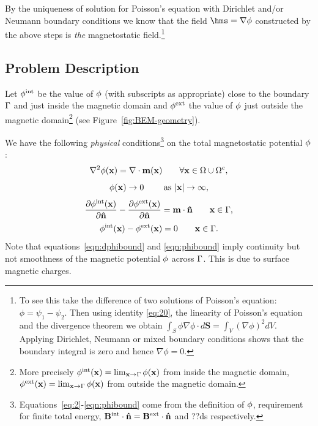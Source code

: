 By the uniqueness of solution for Poisson's equation with Dirichlet and/or Neumann boundary conditions we know that the field $ \hms = \nabla \phim$  constructed by the above steps is \emph{the} magnetostatic field.\footnote{To see this take the difference of two solutions of Poisson's equation: $\phi = \psi_1 - \psi_2$. Then using identity \eqref{eq:20}, the linearity of Poisson's equation and the divergence theorem we obtain $\int_S \phi \nabla \phi \cdot d \mathbf{S} = \int_V (\nabla \phi)^2 dV$. Applying Dirichlet, Neumann or mixed boundary conditions shows that the boundary integral is zero and hence $\nabla \phi = 0$.}

\subsection{Problem Description}
\label{sec:problem-description}
Let $\phi^{\text{int}}$ be the value of $\phi$ (with subscripts as appropriate) close to the boundary ${\Gamma}$ and just inside the magnetic domain  and $\phi^{\text{ext}}$ the value of $\phi$ just outside the magnetic domain\footnote{More precisely $\phi^{\text{int}}(\mathbf{x}) = \lim_{\mathbf{x} \rightarrow {\Gamma}} \phi(\mathbf{x})$ from inside the magnetic domain, $\phi^{\text{ext}}(\mathbf{x}) = \lim_{\mathbf{x} \rightarrow {\Gamma}} \phi(\mathbf{x})$ from outside the magnetic domain.} (see Figure~\ref{fig:BEM-geometry}).

We have the following \emph{physical} conditions\footnote{Equations~\eqref{eq:2}-\eqref{eqn:phibound} come from the definition of $\phi$, requirement for finite total energy, $\mathbf{B}^\text{int} \cdot \mathbf{\hat{n}} = \mathbf{B}^\text{ext} \cdot \mathbf{\hat{n}}$ and ??ds respectively.} on the total magnetostatic potential $\phi$:
\begin{equation}
  \nabla^2 \phi(\mathbf{x}) = \nabla \cdot \mathbf{m}(\mathbf{x}) \qquad \forall \mathbf{x} \in \Omega \cup {\Omega^c},
  \label{eq:2}
\end{equation}
\begin{equation}
  \phi(\mathbf{x}) \rightarrow 0 \qquad \text{ as } \lvert \mathbf{x} \rvert \rightarrow \infty,
\end{equation}
\begin{equation}
  \frac{\partial \phi^{\text{int}}(\mathbf{x})}{\partial \mathbf{\hat{n}}} - \frac{\partial \phi^{\text{ext}}(\mathbf{x})}{\partial \mathbf{\hat{n}}} = \mathbf{m} \cdot \mathbf{\hat{n}} \qquad \mathbf{x} \in {\Gamma},
  \label{eqn:dphibound}
\end{equation}
\begin{equation}
  \phi^{\text{int}}(\mathbf{x}) - \phi^{\text{ext}}(\mathbf{x})  = 0 \qquad \mathbf{x} \in {\Gamma}.
  \label{eqn:phibound}
\end{equation}
Note that equations~\eqref{eqn:dphibound} and \eqref{eqn:phibound} imply continuity but not smoothness of the magnetic potential $\phi$ across ${\Gamma}$. This is due to surface magnetic charges.

